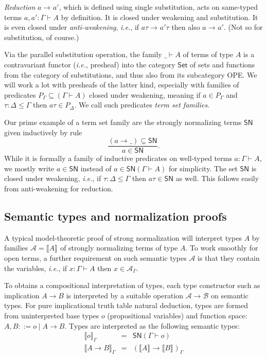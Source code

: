\documentclass[a4paper,USenglish,cleveref, autoref, thm-restate]{lipics-v2019}
\newcommand{\ie}{\emph{i.e.}\xspace}
\newcommand{\den}[2][]{\llbracket#2\rrbracket^{#1}}
\newcommand{\ru}{\dfrac}
\newcommand{\Den}[2]{\den{#1}_{#2}}
\newcommand{\Set}{\mathsf{Set}}
\newcommand{\red}[1][]{\longrightarrow_{#1}}
\newcommand{\A}{\mathcal{A}}
\newcommand{\B}{\mathcal{B}}
\newcommand{\SN}{\mathsf{SN}}
\begin{document}
\emph{Reduction} $a \red a'$, which is defined using single substitution,
acts on same-typed terms
$a,a' : \Gamma \vdash A$ by definition.  It is closed under weakening
and substitution.  It is even closed under \emph{anti-weakening}, \ie,
if $a\tau \red a'\tau$ then also $a \red a'$.  (Not so for
substitution, of course.)

Via the parallel substitution operation, the family $\_ \vdash A$ of
terms of type $A$ is a contravariant functor (\ie, presheaf) into the
category $\Set$ of sets and functions from the category of
substitutions, and thus also from its subcategory OPE.  We will work a
lot with presheafs of the latter kind, especially with families of
predicates $P_\Gamma \subseteq (\Gamma \vdash A)$ closed under
weakening, meaning if $a \in P_\Gamma$ and $\tau : \Delta \leq \Gamma$
then $a \tau \in P_\Delta$.  We call such predicates \emph{term set
  families}.

Our prime example of a term set family are the strongly normalizing
terms $\SN$ given inductively by rule
\[
  \ru{(a \red \_) \subseteq \SN
    }{a \in \SN}
  .
\]
While it is formally a family of inductive predicates on well-typed terms
$a : \Gamma \vdash A$, we mostly write $a \in \SN$ instead of
$a \in \SN(\Gamma \vdash A)$ for simplicity.  The set $\SN$ is closed
under weakening, \ie, if $\tau : \Delta \leq \Gamma$ then
$a\tau \in \SN$ as well.  This follows easily from anti-weakening for
reduction.

\subsection{Semantic types and normalization proofs}

A typical model-theoretic proof of strong normalization will interpret
types $A$ by families $\A = \den A$ of strongly normalizing terms of type $A$.
To work smoothly for open terms, a further requirement on such
semantic types $\A$ is that they contain the variables, \ie,
if $x : \Gamma \vdash A$ then $x \in \A_\Gamma$.

To obtains a compositional interpretation of types, each type
constructor such as implication $A \to B$ is interpreted by a suitable
operation $\A \to \B$ on semantic types.
For pure implicational truth table natural deduction, types are formed
from uninterpreted base types $o$ (propositional variables) and
function space: $A,B ::= o \mid A \to B$.  Types are interpreted as
the following semantic types:
\[
\begin{array}{lll}
  \Den o \Gamma & = & \SN(\Gamma \vdash o) \\
  \Den{A \to B} \Gamma & = & (\den A \to \den B)_\Gamma \\
\end{array}
\]
\end{document}
